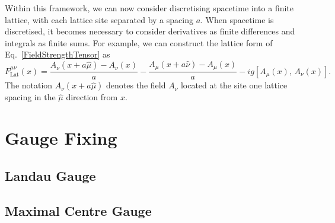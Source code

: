 Within this framework, we can now consider discretising spacetime into a finite lattice, with each lattice site separated by a spacing $a$. When spacetime is discretised, it becomes necessary to consider derivatives as finite differences and integrals as finite sums. For example, we can construct the lattice form of Eq.~\ref{FieldStrengthTensor} as
\begin{equation}
F_{\text{Lat}}^{\mu\nu}(x) = \frac{A_\nu(x+a\hat{\mu})-A_\nu(x)}{a}-\frac{A_\mu(x+a\hat{\nu})-A_\mu(x)}{a}-ig[A_\mu(x),\,A_\nu(x)].
\label{DiscreteFST}
\end{equation}
The notation $A_\nu(x+a\hat{\mu})$ denotes the field $A_\nu$ located at the site one lattice spacing in the $\hat{\mu}$ direction from $x$.
\section{Gauge Fixing}
\subsection{Landau Gauge}
\subsection{Maximal Centre Gauge}


%
%
%
%
%
